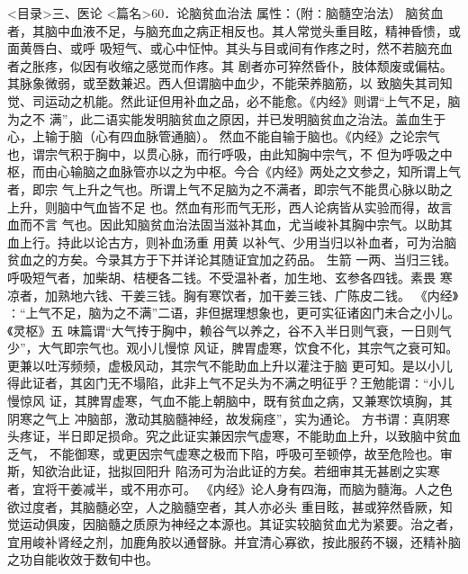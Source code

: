 \documentclass[a4paper,12pt,UTF8,twoside]{ctexbook}
\begin{document}
<目录>三、医论
<篇名>60．论脑贫血治法
属性：（附∶脑髓空治法） 
脑贫血者，其脑中血液不足，与脑充血之病正相反也。其人常觉头重目眩，精神昏愦，或面黄唇白、或呼 
吸短气、或心中怔忡。其头与目或间有作疼之时，然不若脑充血者之胀疼，似因有收缩之感觉而作疼。其 
剧者亦可猝然昏仆，肢体颓废或偏枯。其脉象微弱，或至数兼迟。西人但谓脑中血少，不能荣养脑筋，以 
致脑失其司知觉、司运动之机能。然此证但用补血之品，必不能愈。《内经》则谓“上气不足，脑为之不 
满”，此二语实能发明脑贫血之原因，并已发明脑贫血之治法。盖血生于心，上输于脑（心有四血脉管通脑）。 
然血不能自输于脑也。《内经》之论宗气也，谓宗气积于胸中，以贯心脉，而行呼吸，由此知胸中宗气，不 
但为呼吸之中枢，而由心输脑之血脉管亦以之为中枢。今合《内经》两处之文参之，知所谓上气者，即宗 
气上升之气也。所谓上气不足脑为之不满者，即宗气不能贯心脉以助之上升，则脑中气血皆不足 
也。然血有形而气无形，西人论病皆从实验而得，故言血而不言 
气也。因此知脑贫血治法固当滋补其血，尤当峻补其胸中宗气。以助其血上行。持此以论古方，则补血汤重 
用黄 以补气、少用当归以补血者，可为治脑贫血之的方矣。今录其方于下并详论其随证宜加之药品。 
生箭 一两、当归三钱。呼吸短气者，加柴胡、桔梗各二钱。不受温补者，加生地、玄参各四钱。素畏 
寒凉者，加熟地六钱、干姜三钱。胸有寒饮者，加干姜三钱、广陈皮二钱。 
《内经》∶“上气不足，脑为之不满”二语，非但据理想象也，更可实征诸囟门未合之小儿。《灵枢》五 
味篇谓“大气抟于胸中，赖谷气以养之，谷不入半日则气衰，一日则气少”，大气即宗气也。观小儿慢惊 
风证，脾胃虚寒，饮食不化，其宗气之衰可知。更兼以吐泻频频，虚极风动，其宗气不能助血上升以灌注于脑 
更可知。是以小儿得此证者，其囟门无不塌陷，此非上气不足头为不满之明征乎？王勉能谓∶“小儿慢惊风 
证，其脾胃虚寒，气血不能上朝脑中，既有贫血之病，又兼寒饮填胸，其阴寒之气上 
冲脑部，激动其脑髓神经，故发痫痉”，实为通论。 
方书谓∶真阴寒头疼证，半日即足损命。究之此证实兼因宗气虚寒，不能助血上升，以致脑中贫血乏气， 
不能御寒，或更因宗气虚寒之极而下陷，呼吸可至顿停，故至危险也。审斯，知欲治此证，拙拟回阳升 
陷汤可为治此证的方矣。若细审其无甚剧之实寒者，宜将干姜减半，或不用亦可。 
《内经》论人身有四海，而脑为髓海。人之色欲过度者，其脑髓必空，人之脑髓空者，其人亦必头 
重目眩，甚或猝然昏厥，知觉运动俱废，因脑髓之质原为神经之本源也。其证实较脑贫血尤为紧要。治之者， 
宜用峻补肾经之剂，加鹿角胶以通督脉。并宜清心寡欲，按此服药不辍，还精补脑之功自能收效于数旬中也。 
\end{document}
